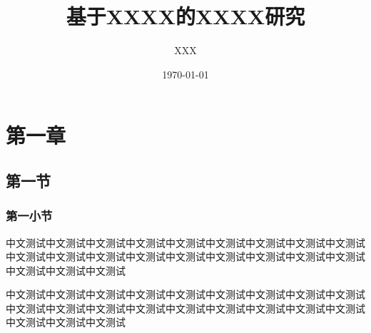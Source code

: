 \documentclass{ustb-thesis}
\title{基于XXXX的XXXX研究}
\author{XXX}
\date{\today}
\begin{document}
\maketitle
\chapter{第一章}
\section{第一节}
\subsection{第一小节}
中文测试中文测试中文测试中文测试中文测试中文测试中文测试中文测试中文测试中文测试中文测试中文测试中文测试中文测试中文测试中文测试中文测试中文测试中文测试中文测试中文测试

中文测试中文测试中文测试中文测试中文测试中文测试中文测试中文测试中文测试中文测试中文测试中文测试中文测试中文测试中文测试中文测试中文测试中文测试中文测试中文测试中文测试
\end{document}
